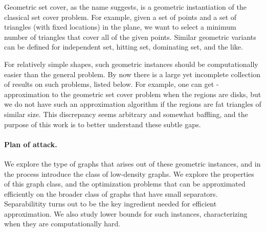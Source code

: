 \documentclass[12pt]{article}
\theoremstyle{remark}\theoremheaderfont{\sf}\theorembodyfont{\upshape}
\numberwithin{figure}{section}\numberwithin{table}{section}\numberwithin{equation}{section}
\begin{document}
Geometric set cover, as the name suggests, is a geometric
instantiation of the classical set cover problem. For example, given a
set of points and a set of triangles (with fixed locations) in the
plane, we want to select a minimum number of triangles that cover all
of the given points. Similar geometric variants can be defined for
independent set, hitting set, dominating set, and the like.

For relatively simple shapes, such geometric instances should be
computationally easier than the general problem. By now there is a
large yet incomplete collection of results on such problems, listed
below. For example, one can get -approximation to the
geometric set cover problem when the regions are disks, but we do not
have such an approximation algorithm if the regions are fat triangles
of similar size.  This discrepancy seems arbitrary and somewhat
baffling, and the purpose of this work is to better understand these
subtle gaps.


\paragraph{Plan of attack.}
We explore the type of graphs that arises out of these geometric
instances, and in the process introduce the class of low-density
graphs. We explore the properties of this graph class, and the
optimization problems that can be approximated efficiently on the
broader class of graphs that have small separators. Separabilitity
turns out to be the key ingredient needed for efficient approximation.
We also study lower bounds for such instances, characterizing when
they are computationally hard.
\end{document}
